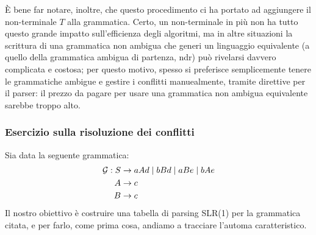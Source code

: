 \documentclass[class=book, crop=false, oneside, 12pt]{standalone}
\begin{document}
È bene far notare, inoltre, che questo procedimento ci ha portato ad aggiungere il non-terminale \(T\) alla grammatica. Certo, un non-terminale in più non ha tutto questo grande impatto sull'efficienza degli algoritmi, ma in altre situazioni la scrittura di una grammatica non ambigua che generi un linguaggio equivalente (a quello della grammatica ambigua di partenza, ndr) può rivelarsi davvero complicata e costosa; per questo motivo, spesso si preferisce semplicemente tenere le grammatiche ambigue e gestire i conflitti manuealmente, tramite direttive per il parser: il prezzo da pagare per usare una grammatica non ambigua equivalente sarebbe troppo alto.

\subsubsection{Esercizio sulla risoluzione dei conflitti}
Sia data la seguente grammatica:
\begin{align}
    \label{eq:ex3-slr1-grammarr}
    \mathcal{G}: S &\to aAd \mid bBd \mid aBe \mid bAe \\
    A &\to c \nonumber \\ \notag
    B &\to c \notag
\end{align}
Il nostro obiettivo è costruire una tabella di parsing SLR(1) per la grammatica citata, e per farlo, come prima cosa, andiamo a tracciare l'automa caratteristico.
\end{document}
